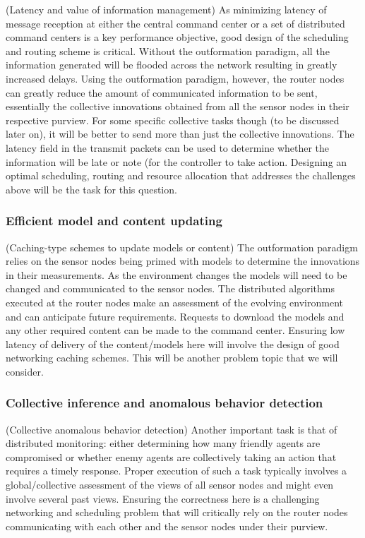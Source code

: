\documentclass[12pt,letterpaper]{article}
\begin{document}
(Latency and value of information management) As minimizing latency of message reception at either the central command center or a set of distributed command centers is a key performance objective, good design of the scheduling and routing scheme is critical. Without the outformation paradigm, all the information generated will be flooded across the network resulting in greatly increased delays. Using the outformation paradigm, however, the router nodes can greatly reduce the amount of communicated information to be sent, essentially the collective innovations obtained from all the sensor nodes in their respective purview. For some specific collective tasks though (to be discussed later on), it will be better to send more than just the collective innovations. The latency field in the transmit packets can be used to determine whether the information will be late or note (for the controller to take action. Designing an optimal scheduling, routing and resource allocation that addresses the challenges above will be the task for this question.

\subsubsection{Efficient model and content updating}\label{subsec:caching}

(Caching-type schemes to update models or content) The outformation paradigm relies on the sensor nodes being primed with models to determine the innovations in their measurements. As the environment changes the models will need to be changed and communicated to the sensor nodes. The distributed algorithms executed at the router nodes make an assessment of the evolving environment and can anticipate future requirements. Requests to download the models and any other required content can be made to the command center. Ensuring low latency of delivery of the content/models here will involve the design of good networking caching schemes. This will be another problem topic that we will consider.

\subsubsection{Collective inference and anomalous behavior detection}\label{subsec:inference}

(Collective anomalous behavior detection) Another important task is that of distributed monitoring: either determining how many friendly agents are compromised or whether enemy agents are collectively taking an action that requires a timely response. Proper execution of such a task typically involves a global/collective assessment of the views of all sensor nodes and might even involve several past views. Ensuring the correctness here is a challenging networking and scheduling problem that will critically rely on the router nodes communicating with each other and the sensor nodes under their purview. 
\end{document}
